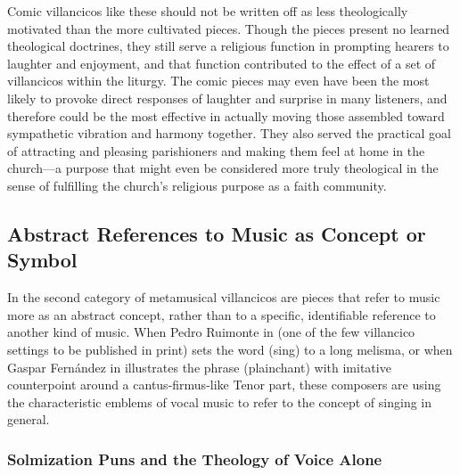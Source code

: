 Comic villancicos like these should not be written off as less theologically
motivated than the more cultivated pieces.
Though the  pieces present no learned theological
doctrines, they still serve a religious function in prompting hearers to
laughter and enjoyment, and that function contributed to the effect of a set of
villancicos within the liturgy.
The comic pieces may even have been the most likely to provoke direct responses
of laughter and surprise in many listeners, and therefore could be the most
effective in actually moving those assembled toward sympathetic vibration and
harmony together. 
They also served the practical goal of attracting and pleasing parishioners and
making them feel at home in the church---a purpose that might even be
considered more truly theological in the sense of fulfilling the church's
religious purpose as a faith community.

\subsection{Abstract References to Music as Concept or Symbol}

In the second category of metamusical villancicos are pieces that refer to
music more as an abstract concept, rather than to a specific, identifiable
reference to another kind of music.
When Pedro Ruimonte in  (one of the few villancico
settings to be published in print) sets the word  (sing) to a
long melisma, or when Gaspar Fernández in 
illustrates the phrase  (plainchant) with imitative
counterpoint around a cantus-firmus-like Tenor part, these composers are using
the characteristic emblems of vocal music to refer to the concept of singing in
general.%
    \Autocites
    {Ruimonte:Parnaso}
    {Fernandez:Cancionero}
    [for crucial emendations to the latter composer's biography, see][]
    {Morales:Fernandez}

\subsubsection{Solmization Puns and the Theology of Voice Alone}

